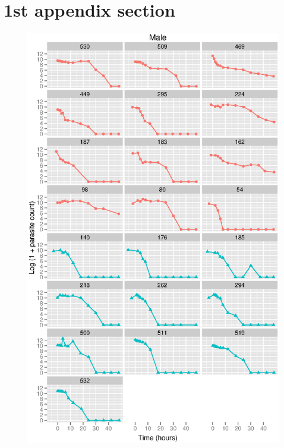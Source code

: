 \renewcommand{\appendixtocname}{TOC appendix title}
\appendix
\appendixpage
\addappheadtotoc
\section{1st appendix section}
\begin{figure}
\includegraphics[width=150mm]{lograwM.eps}
\end{figure}
